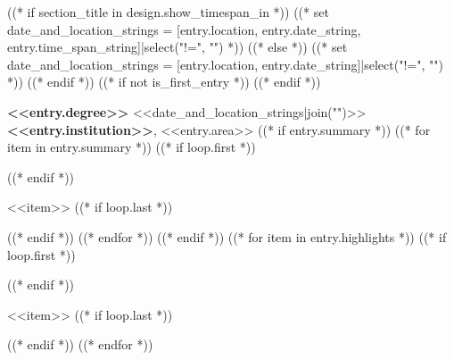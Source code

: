 ((* if section_title in design.show_timespan_in *))
    ((* set date_and_location_strings = [entry.location, entry.date_string, entry.time_span_string]|select("!=", "") *))
((* else *))
    ((* set date_and_location_strings = [entry.location, entry.date_string]|select("!=", "") *))
((* endif *))
((* if not is_first_entry *))
\vspace{<<design.margins.entry_area.vertical_between>>}
((* endif *))

\begin{threecolentry}{\textbf{<<entry.degree>>}}{
    <<date_and_location_strings|join("\n\n")>>
}
    \textbf{<<entry.institution>>}, <<entry.area>>
((* if entry.summary *))
    ((* for item in entry.summary *))
    ((* if loop.first *))
    \begin{summary}
        ((* endif *))
        \item <<item>>
        ((* if loop.last *))
    \end{summary}
        ((* endif *))
    ((* endfor *))
((* endif *))
((* for item in entry.highlights *))
    ((* if loop.first *))
    \begin{highlights}
    ((* endif *))
        \item <<item>>
    ((* if loop.last *))
    \end{highlights}
    ((* endif *))
((* endfor *))
\end{threecolentry}